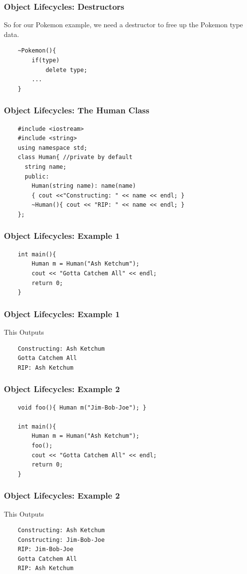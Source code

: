 \documentclass{beamer}
\begin{document}
\begin{frame}[fragile]
    \frametitle{Object Lifecycles: Destructors}
    So for our Pokemon example, we need a destructor to free up the Pokemon type data.

    \begin{verbatim}
    ~Pokemon(){ 
        if(type) 
            delete type;
        ...
    }
    \end{verbatim}
\end{frame}

\begin{frame}[fragile]
    \frametitle{Object Lifecycles: The Human Class}
    \begin{verbatim}
    #include <iostream>
    #include <string>
    using namespace std;
    class Human{ //private by default
      string name;
      public:
        Human(string name): name(name) 
        { cout <<"Constructing: " << name << endl; }
        ~Human(){ cout << "RIP: " << name << endl; }
    };
    \end{verbatim}
\end{frame}
\begin{frame}[fragile]
    \frametitle{Object Lifecycles: Example 1}
    \begin{verbatim}
    int main(){
        Human m = Human("Ash Ketchum");
        cout << "Gotta Catchem All" << endl;
        return 0;
    }
    \end{verbatim}
\end{frame}
\begin{frame}[fragile]
    \frametitle{Object Lifecycles: Example 1}
    This Outputs
    \begin{verbatim}
    Constructing: Ash Ketchum
    Gotta Catchem All
    RIP: Ash Ketchum
    \end{verbatim}

\end{frame}

\begin{frame}[fragile]
    \frametitle{Object Lifecycles: Example 2}
    \begin{verbatim}
    void foo(){ Human m("Jim-Bob-Joe"); }

    int main(){
        Human m = Human("Ash Ketchum");
        foo();
        cout << "Gotta Catchem All" << endl;
        return 0;
    }
    \end{verbatim}
\end{frame}
\begin{frame}[fragile]
    \frametitle{Object Lifecycles: Example 2}
    This Outputs
    \begin{verbatim}
    Constructing: Ash Ketchum
    Constructing: Jim-Bob-Joe
    RIP: Jim-Bob-Joe
    Gotta Catchem All
    RIP: Ash Ketchum
    \end{verbatim}

\end{frame}
\end{document}
